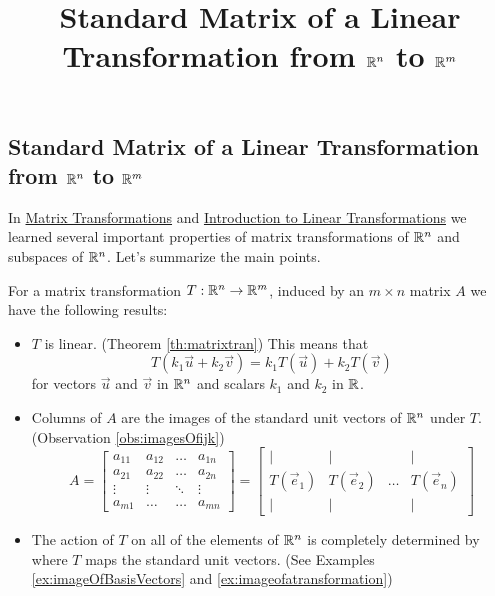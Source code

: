 \documentclass{ximera}
\title{Standard Matrix of a Linear Transformation from $\mathbb{R}^n$ to $\mathbb{R}^m$} \license{CC BY-NC-SA 4.0}
\begin{document}
\begin{abstract}
 \end{abstract}
\maketitle

\begin{onlineOnly}
\section*{Standard Matrix of a Linear Transformation from $\mathbb{R}^n$ to $\mathbb{R}^m$}
\end{onlineOnly}

In \href{https://ximera.osu.edu/oerlinalg/LinearAlgebra/LTR-0005/main}{Matrix Transformations} and \href{https://ximera.osu.edu/oerlinalg/LinearAlgebra/LTR-0010/main}{Introduction to Linear Transformations} we learned several important properties of matrix transformations of $\mathbb{R}^n$ and subspaces of $\mathbb{R}^n$.  Let's summarize the main points.

\begin{summary}\label{sum:matrixTrans}
For a matrix transformation $T:\mathbb{R}^n\rightarrow\mathbb{R}^m$, induced by an $m\times n$ matrix $A$ we have the following results:
\begin{itemize}
    \item $T$ is linear. (Theorem \ref{th:matrixtran})  This means that 
    $$T(k_1\vec{u}+k_2\vec{v})= k_1T(\vec{u})+k_2T(\vec{v})$$
    for vectors $\vec{u}$ and $\vec{v}$ in $\mathbb{R}^n$ and scalars $k_1$ and $k_2$ in $\mathbb{R}$.
    \item Columns of $A$ are the images of the standard unit vectors of $\mathbb{R}^n$ under $T$. (Observation \ref{obs:imagesOfijk})
 \begin{equation*} \label{eq:matlintrans}
 A=\begin{bmatrix}
           a_{11} & a_{12}&\dots&a_{1n}\\
           a_{21}&a_{22} &\dots &a_{2n}\\
		\vdots & \vdots&\ddots &\vdots\\
		a_{m1}&\dots &\dots &a_{mn}
         \end{bmatrix}
		 = 
         \begin{bmatrix}
           | & |& &|\\
		T(\vec{e}_1) & T(\vec{e}_2)&\dots &T(\vec{e}_n)\\
		|&| & &|
         \end{bmatrix}
\end{equation*}
    
    \item The action of $T$ on all of the elements of $\mathbb{R}^n$ is completely determined by where $T$ maps the standard unit vectors. (See Examples \ref{ex:imageOfBasisVectors} and \ref{ex:imageofatransformation})
\end{itemize}
    
\end{summary}
\end{document}

